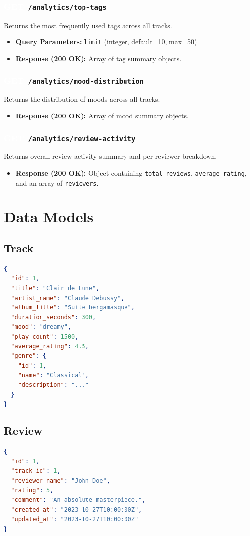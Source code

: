 \documentclass[11pt,a4paper]{article}
\newcommand{\methodGET}{\colorbox{getcolor}{\textcolor{white}{\textbf{GET}}}}
\begin{document}
\subsubsection*{\methodGET \texttt{ /analytics/top-tags}}
Returns the most frequently used tags across all tracks.
\begin{itemize}[label=\textcolor{primary}{\textbullet}, noitemsep]
    \item \textbf{Query Parameters:} \texttt{limit} (integer, default=10, max=50)
    \item \textbf{Response (200 OK):} Array of tag summary objects.
\end{itemize}

\subsubsection*{\methodGET \texttt{ /analytics/mood-distribution}}
Returns the distribution of moods across all tracks.
\begin{itemize}[label=\textcolor{primary}{\textbullet}, noitemsep]
    \item \textbf{Response (200 OK):} Array of mood summary objects.
\end{itemize}

\subsubsection*{\methodGET \texttt{ /analytics/review-activity}}
Returns overall review activity summary and per-reviewer breakdown.
\begin{itemize}[label=\textcolor{primary}{\textbullet}, noitemsep]
    \item \textbf{Response (200 OK):} Object containing \texttt{total\_reviews}, \texttt{average\_rating}, and an array of \texttt{reviewers}.
\end{itemize}

\section{Data Models}

\subsection{Track}
\begin{lstlisting}[language=json]
{
  "id": 1,
  "title": "Clair de Lune",
  "artist_name": "Claude Debussy",
  "album_title": "Suite bergamasque",
  "duration_seconds": 300,
  "mood": "dreamy",
  "play_count": 1500,
  "average_rating": 4.5,
  "genre": {
    "id": 1,
    "name": "Classical",
    "description": "..."
  }
}
\end{lstlisting}

\subsection{Review}
\begin{lstlisting}[language=json]
{
  "id": 1,
  "track_id": 1,
  "reviewer_name": "John Doe",
  "rating": 5,
  "comment": "An absolute masterpiece.",
  "created_at": "2023-10-27T10:00:00Z",
  "updated_at": "2023-10-27T10:00:00Z"
}
\end{lstlisting}
\end{document}
